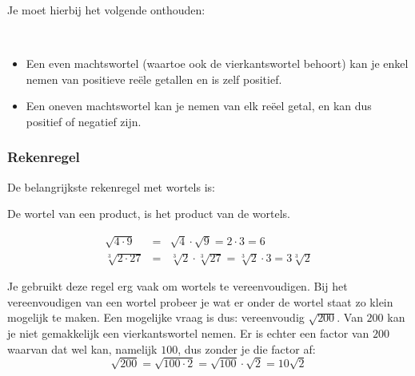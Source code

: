 Je moet hierbij het volgende onthouden:

%

\begin{ftonthoud}
	\ \\
\begin{itemize}
	\item Een even machtswortel (waartoe ook de vierkantswortel behoort) kan je enkel nemen van positieve re\"ele getallen en is zelf positief.
	\item Een oneven machtswortel kan je nemen van elk re\"eel getal, en kan dus positief of negatief zijn.
\end{itemize}		
\end{ftonthoud}

\subsubsection{Rekenregel}

De belangrijkste rekenregel met wortels is:

\begin{ftrekenregel}
	De wortel van een product, is het product van de wortels.
\end{ftrekenregel}

\begin{voorbeeld}
	\begin{eqnarray*}
\sqrt{4 \cdot 9} &=& \sqrt{4}\cdot \sqrt{9} = 2 \cdot 3 = 6 \\
\sqrt[3]{2 \cdot 27} &=& \sqrt[3]{2} \cdot \sqrt[3]{27} = \sqrt[3]{2} \cdot 3 = 3 \sqrt[3]{2}
\end{eqnarray*}
\end{voorbeeld}

Je gebruikt deze regel erg vaak om wortels te vereenvoudigen. Bij het vereenvoudigen van een wortel probeer je wat er onder de wortel staat zo klein mogelijk te maken. Een mogelijke vraag is dus: vereenvoudig $\sqrt{200}$. Van $200$ kan je niet gemakkelijk een vierkantswortel nemen. Er is echter een factor van $200$ waarvan dat wel kan, namelijk $100$, dus zonder je die factor af:
\begin{equation*}
\sqrt{200}=\sqrt{100 \cdot 2} = \sqrt{100} \cdot \sqrt{2} = 10\sqrt{2}
\end{equation*}


